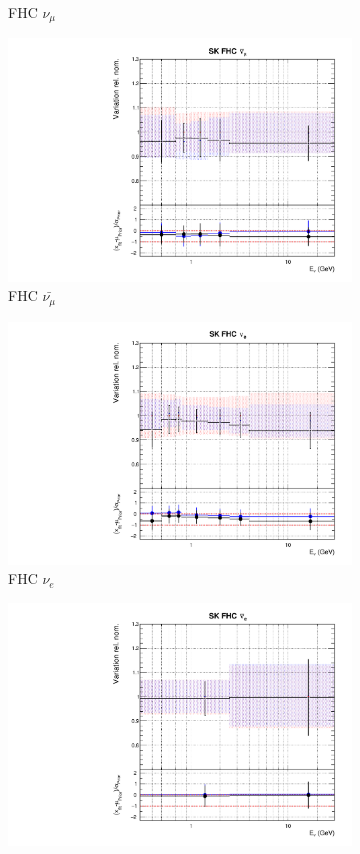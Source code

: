 \begin{figure}[t]
\begin{subfigure}{0.42\textwidth}
  \caption{\SK FHC $\nu_{\mu}$}
\end{subfigure}
\begin{subfigure}{0.42\textwidth}
  \centering
  \includegraphics[width=0.75\linewidth]{figs/rhcmpasmvflux9}
  \caption{\SK FHC $\bar{\nu_{\mu}}$}
\end{subfigure}
\begin{subfigure}{0.42\textwidth}
  \centering
  \includegraphics[width=0.75\linewidth]{figs/rhcmpasmvflux10}
  \caption{\SK FHC $\nu_e$}
\end{subfigure}
\begin{subfigure}{0.42\textwidth}
  \centering
  \includegraphics[width=0.75\linewidth]{figs/rhcmpasmvflux11}

\end{subfigure}
\end{figure}
